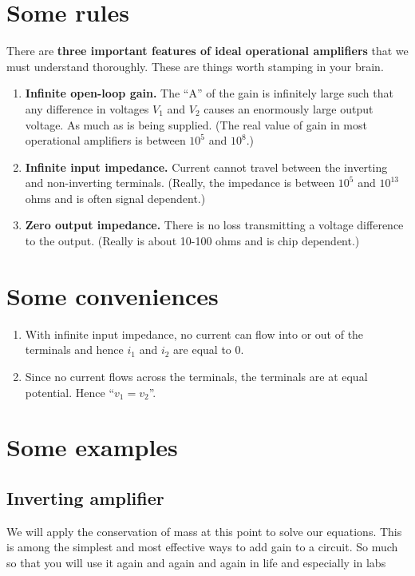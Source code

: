 \documentclass[11pt]{book}
\begin{document}
\section{Some rules}
There are \textbf{three important features of ideal operational amplifiers} that we must understand thoroughly. These are things worth stamping in your brain.

\begin{enumerate}
	\item \textbf{Infinite open-loop gain.} The ``A'' of the gain is infinitely large such that any difference in voltages $V_1$ and $V_2$ causes an enormously large output voltage. As much as is being supplied. (The real value of gain in most operational amplifiers is between $10^{5}$ and $10^8$.)
	\item \textbf{Infinite input impedance.} Current cannot travel between the inverting and non-inverting terminals. (Really, the impedance is between $10^5$ and $10^13$ ohms and is often signal dependent.)
	\item \textbf{Zero output impedance.} There is no loss transmitting a voltage difference to the output. (Really is about 10-100 ohms and is chip dependent.)
\end{enumerate}

\section{Some conveniences}
\begin{enumerate}
	\item With infinite input impedance, no current can flow into or out of the terminals and hence $i_1$ and $i_2$ are equal to 0.
	\item Since no current flows across the terminals, the terminals are at equal potential. Hence ``$v_1 = v_2$''.
\end{enumerate}

\newpage
\section{Some examples}

\subsection{Inverting amplifier}
We will apply the conservation of mass at this point to solve our equations.  This is among the simplest and most effective ways to add gain to a circuit. So much so that you will use it again and again and again in life and especially in labs
\end{document}
